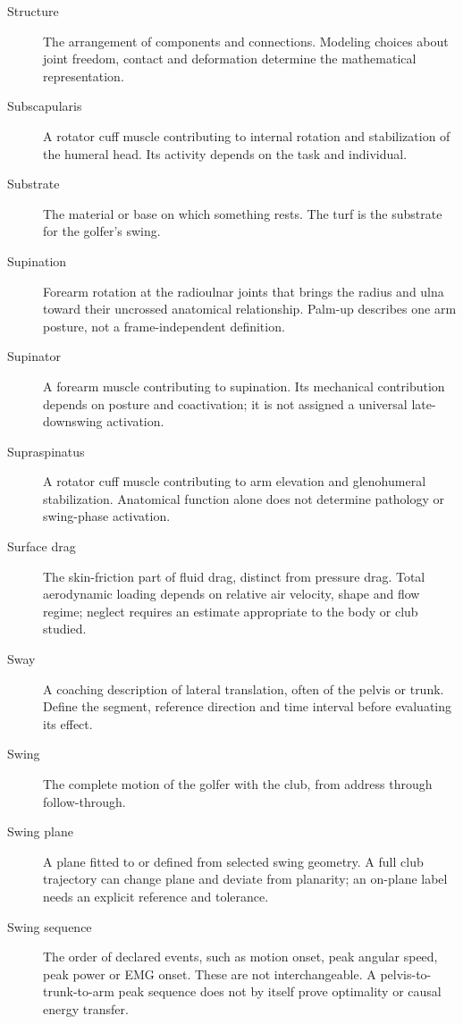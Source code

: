 \begin{description}
\item[Structure] The arrangement of components and connections. Modeling choices about joint freedom, contact and deformation determine the mathematical representation.

\item[Subscapularis] A rotator cuff muscle contributing to internal rotation and stabilization of the humeral head. Its activity depends on the task and individual.

\item[Substrate] The material or base on which something rests. The turf is the substrate for the golfer's swing.

\item[Supination] Forearm rotation at the radioulnar joints that brings the radius and ulna toward their uncrossed anatomical relationship. Palm-up describes one arm posture, not a frame-independent definition.

\item[Supinator] A forearm muscle contributing to supination. Its mechanical contribution depends on posture and coactivation; it is not assigned a universal late-downswing activation.

\item[Supraspinatus] A rotator cuff muscle contributing to arm elevation and glenohumeral stabilization. Anatomical function alone does not determine pathology or swing-phase activation.

\item[Surface drag] The skin-friction part of fluid drag, distinct from pressure drag. Total aerodynamic loading depends on relative air velocity, shape and flow regime; neglect requires an estimate appropriate to the body or club studied.

\item[Sway] A coaching description of lateral translation, often of the pelvis or trunk. Define the segment, reference direction and time interval before evaluating its effect.

\item[Swing] The complete motion of the golfer with the club, from address through follow-through.

\item[Swing plane] A plane fitted to or defined from selected swing geometry. A full club trajectory can change plane and deviate from planarity; an on-plane label needs an explicit reference and tolerance.

\item[Swing sequence] The order of declared events, such as motion onset, peak angular speed, peak power or EMG onset. These are not interchangeable. A pelvis-to-trunk-to-arm peak sequence does not by itself prove optimality or causal energy transfer.


\end{description}
